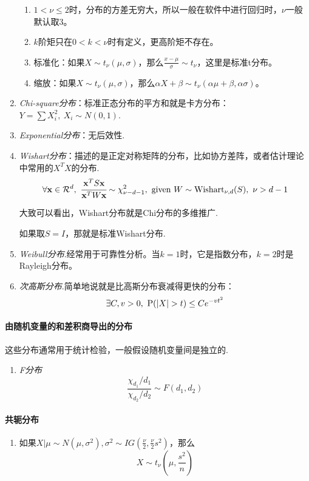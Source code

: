 \begin{enumerate}
    \begin{property}
    \begin{enumerate}
    \item $1<\nu\leq 2$时，分布的方差无穷大，所以一般在软件中进行回归时，$\nu$一般默认取3。
    \item $k$阶矩只在$0<k<\nu$时有定义，更高阶矩不存在。
    \item 标准化：如果$X\sim t_{\nu}(\mu,\sigma)$，那么$\frac{x-\mu}{\sigma}\sim t_{\nu}$，这里是标准t分布。
    \item 缩放：如果$X\sim t_{\nu}(\mu,\sigma)$，那么$\alpha X+\beta\sim t_{\nu}(\alpha \mu+\beta, \alpha\sigma)$。
    \end{enumerate}
    \end{property}
	\item \emph{Chi-square分布}：标准正态分布的平方和就是卡方分布：$Y=\sum X_i^2,\ X_i\sim N(0,1)$.
	\item \emph{Exponential分布}：无后效性.
	\item \emph{Wishart分布}：描述的是正定对称矩阵的分布，比如协方差阵，或者估计理论中常用的$X^TX$的分布.
	$$\forall \mathbf{x}\in \mathcal{R}^d,\ \cfrac{\mathbf{x}^TS \mathbf{x}}{\mathbf{x}^T W \mathbf{x}}\sim \chi_{\nu-d-1}^2,\text{ given }W\sim \text{Wishart}_{\nu,d}(S),\ \nu>d-1$$
	
	大致可以看出，Wishart分布就是Chi分布的多维推广.
	
	如果取$S=I$，那就是标准Wishart分布.
    \item \emph{Weibull分布}.经常用于可靠性分析。当$k=1$时，它是指数分布，$k=2$时是Rayleigh分布。
	\item \emph{次高斯分布}.简单地说就是比高斯分布衰减得更快的分布：
	$$\exists C,v>0,\ \Prob(|X|>t)\leq Ce^{-vt^2}$$
	
\end{enumerate}

\paragraph*{由随机变量的和差积商导出的分布}这些分布通常用于统计检验，一般假设随机变量间是独立的.
\begin{enumerate}
\item \emph{F分布}
$$\frac{\chi_{d_1}/d_1}{\chi_{d_2}/d_2}\sim F(d_1,d_2)$$
\end{enumerate}
\paragraph*{共轭分布}
\begin{enumerate}
\item 如果$X|\mu\sim N(\mu,\sigma^2),\sigma^2\sim IG(\frac{\nu}{2},\frac{\nu}{2}s^2)$，那么
$$X\sim t_{\nu}\left(\mu, \frac{s^2}{n}\right)$$
\end{enumerate}

